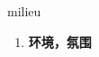 
\begin{frame}
{\huge milieu}
\begin{center}
\begin{enumerate}\Large
  \item \textbf{环境，氛围}
\end{enumerate}
\end{center}
\end{frame}
